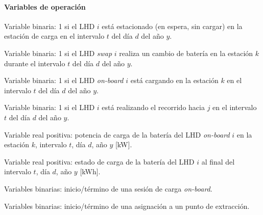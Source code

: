 \noindent{}

\paragraph{Variables de operación}
\begin{description}[leftmargin=3cm, style=nextline]
    \item[$Z_{i,y,d,t}$] Variable binaria: 1 si el LHD $i$ está estacionado (en espera, sin cargar) en la estación de carga en el intervalo $t$ del día $d$ del año $y$.
    \item[$Z^{swap}_{k,i,y,d,t}$] Variable binaria: 1 si el LHD \textit{swap} $i$ realiza un cambio de batería en la estación $k$ durante el intervalo $t$ del día $d$ del año $y$.
    \item[$Z_{k,i,y,d,t}^{charge}$] Variable binaria: 1 si el LHD \textit{on-board} $i$ está cargando en la estación $k$ en el intervalo $t$ del día $d$ del año $y$.
    \item[$Y_{i,j,y,d,t}$] Variable binaria: 1 si el LHD $i$ está realizando el recorrido hacia $j$ en el intervalo $t$ del día $d$ del año $y$.
    \item[$P_{k,i,y,d,t}$] Variable real positiva: potencia de carga de la batería del LHD \textit{on-board} $i$ en la estación $k$, intervalo $t$, día $d$, año $y$ [kW].
    \item[$B_{i,y,d,t}$] Variable real positiva: estado de carga de la batería del LHD $i$ al final del intervalo $t$, día $d$, año $y$ [kWh].
    \item[$StartCharge_{k,i,y,d,t}$, $EndCharge_{k,i,y,d,t}$] Variables binarias: inicio/término de una sesión de carga \textit{on-board}.
    \item[$StartAssign_{i,y,d,t}$, $EndAssign_{i,y,d,t}$] Variables binarias: inicio/término de una asignación a un punto de extracción.
    \item[\change{$B^{s}_{i,y,d,t}$}] 

\end{description}
